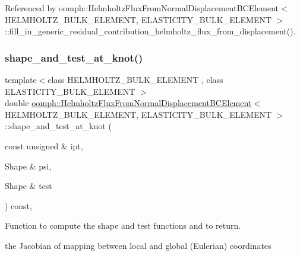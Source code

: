 Referenced by oomph\+::\+Helmholtz\+Flux\+From\+Normal\+Displacement\+B\+C\+Element$<$ H\+E\+L\+M\+H\+O\+L\+T\+Z\+\_\+\+B\+U\+L\+K\+\_\+\+E\+L\+E\+M\+E\+N\+T, E\+L\+A\+S\+T\+I\+C\+I\+T\+Y\+\_\+\+B\+U\+L\+K\+\_\+\+E\+L\+E\+M\+E\+N\+T $>$\+::fill\+\_\+in\+\_\+generic\+\_\+residual\+\_\+contribution\+\_\+helmholtz\+\_\+flux\+\_\+from\+\_\+displacement().

\mbox{\label{classoomph_1_1HelmholtzFluxFromNormalDisplacementBCElement_ad3a879cf569b317c086f07872164f9f8}} 
\subsubsection{\texorpdfstring{shape\+\_\+and\+\_\+test\+\_\+at\+\_\+knot()}{shape\_and\_test\_at\_knot()}}
{\footnotesize\ttfamily template$<$class H\+E\+L\+M\+H\+O\+L\+T\+Z\+\_\+\+B\+U\+L\+K\+\_\+\+E\+L\+E\+M\+E\+NT , class E\+L\+A\+S\+T\+I\+C\+I\+T\+Y\+\_\+\+B\+U\+L\+K\+\_\+\+E\+L\+E\+M\+E\+NT $>$ \\
double \hyperlink{classoomph_1_1HelmholtzFluxFromNormalDisplacementBCElement}{oomph\+::\+Helmholtz\+Flux\+From\+Normal\+Displacement\+B\+C\+Element}$<$ H\+E\+L\+M\+H\+O\+L\+T\+Z\+\_\+\+B\+U\+L\+K\+\_\+\+E\+L\+E\+M\+E\+NT, E\+L\+A\+S\+T\+I\+C\+I\+T\+Y\+\_\+\+B\+U\+L\+K\+\_\+\+E\+L\+E\+M\+E\+NT $>$\+::shape\+\_\+and\+\_\+test\+\_\+at\+\_\+knot (\begin{DoxyParamCaption}\item[{const unsigned \&}]{ipt,  }\item[{Shape \&}]{psi,  }\item[{Shape \&}]{test }\end{DoxyParamCaption}) const\hspace{0.3cm}{\ttfamily [inline]}, {\ttfamily [protected]}}



Function to compute the shape and test functions and to return. 

the Jacobian of mapping between local and global (Eulerian) coordinates 

